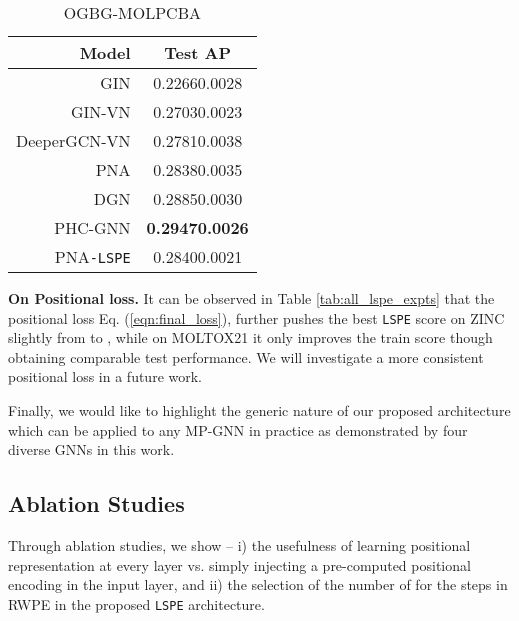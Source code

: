 \documentclass{article} \usepackage{iclr2021_conference,times}
\begin{document}
\begin{table}[!t]
{    \begin{subtable}{.43\linewidth}
      \centering
      \caption{OGBG-MOLPCBA}
        \begin{tabular}{rc}
        \toprule
        \textbf{Model} & \textbf{Test AP}\\
        \midrule
        GIN & 0.22660.0028\\
        GIN-VN & 0.27030.0023\\
        DeeperGCN-VN & 0.27810.0038\\
        PNA & 0.28380.0035\\
        DGN & 0.28850.0030\\
        PHC-GNN & \textbf{0.29470.0026}\\
        \midrule
        PNA\texttt{-LSPE} & 0.28400.0021\\
        \bottomrule
        \end{tabular}
        \label{tab:comparison_molpcba}
    \end{subtable}
    }
    \label{tab:comparison_sota}
    \vspace{-16pt}
\end{table}






{\bf On Positional loss.}
It can be observed in Table \ref{tab:all_lspe_expts} that the positional loss 
Eq. (\ref{eqn:final_loss}),
further pushes the best \texttt{LSPE} score on ZINC slightly from  to , while on MOLTOX21 it only improves the train score though obtaining comparable test performance.
We will investigate a more consistent positional loss in a future work.





Finally, we would like to highlight the generic nature of our proposed architecture which can be applied to any MP-GNN in practice as demonstrated by four diverse GNNs in this work.



\subsection{Ablation Studies}
\label{sec:experiments_ablation_studies}
Through ablation studies, we show -- i) the usefulness of learning positional representation at every layer vs. simply injecting a pre-computed positional encoding in the input layer,
and ii) the selection of the number of  for the steps in RWPE in the proposed \texttt{LSPE} architecture.
\end{document}
